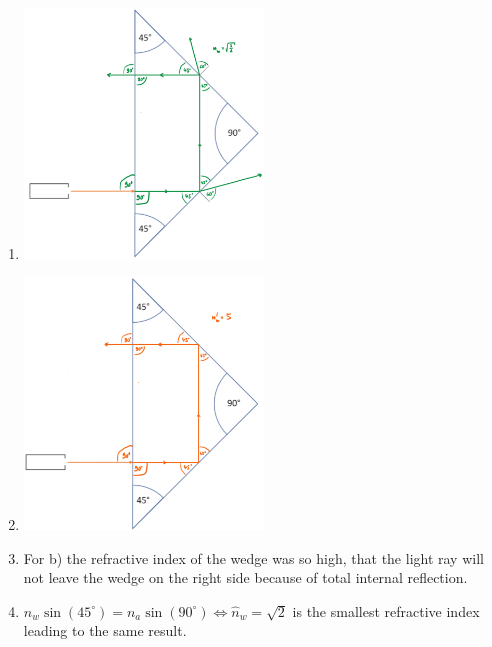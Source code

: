 \documentclass{article}
\begin{document}
    \begin{enumerate}[label=\alph*)]
        \item \includegraphics[width=0.5\textwidth]{3a.png}
        \item \includegraphics[width=0.5\textwidth]{3b.png}
        \item For b) the refractive index of the wedge was so high, that the light ray will not leave the wedge on the right side because of total internal reflection.
        \item $\hat{n}_w \sin(45^\circ) = n_a \sin(90^\circ) \Leftrightarrow \hat{n}_w = \sqrt{2}$ is the smallest refractive index leading to the same result.
    \end{enumerate}
    
\end{document}
